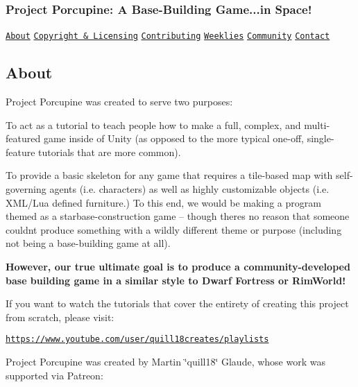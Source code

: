 \subsubsection*{Project Porcupine\+: A Base-\/\+Building Game...in Space!}



\href{#about}{\tt About} \href{#copyright--licensing}{\tt Copyright \& Licensing} \href{#contributing}{\tt Contributing} \href{#weeklies}{\tt Weeklies} \href{#community}{\tt Community} \href{#contact}{\tt Contact}

\subsection*{About}

Project Porcupine was created to serve two purposes\+:


\begin{DoxyEnumerate}
\item To act as a tutorial to teach people how to make a full, complex, and multi-\/featured game inside of Unity (as opposed to the more typical one-\/off, single-\/feature tutorials that are more common).
\item To provide a basic skeleton for any game that requires a tile-\/based map with self-\/governing agents (i.\+e. characters) as well as highly customizable objects (i.\+e. X\+M\+L/\+Lua defined furniture.) To this end, we would be making a program themed as a starbase-\/construction game -- though there\textquotesingle{}s no reason that someone couldn\textquotesingle{}t produce something with a wildly different theme or purpose (including not being a base-\/building game at all).
\end{DoxyEnumerate}

{\bfseries However, our true ultimate goal is to produce a community-\/developed base building game in a similar style to Dwarf Fortress or Rim\+World!}

If you want to watch the tutorials that cover the entirety of creating this project from scratch, please visit\+:


\begin{DoxyItemize}
\item \href{https://www.youtube.com/user/quill18creates/playlists}{\tt https\+://www.\+youtube.\+com/user/quill18creates/playlists}
\end{DoxyItemize}

Project Porcupine was created by Martin \char`\"{}quill18\char`\"{} Glaude, whose work was supported via Patreon\+:


